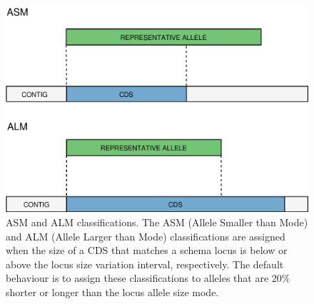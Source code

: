 \newpage
\begin{figure}[h!]
    \centering
    \includegraphics[angle=0,width=\textwidth]{figures/chapter 2/FigureS4.pdf}
    \caption{ASM and ALM classifications. The ASM (Allele Smaller than Mode) and ALM (Allele Larger than Mode) classifications are assigned when the size of a CDS that matches a schema locus is below or above the locus size variation interval, respectively. The default behaviour is to assign these classifications to alleles that are 20\% shorter or longer than the locus allele size mode.}
    \label{fig:chap2_figureS4}
\end{figure}

